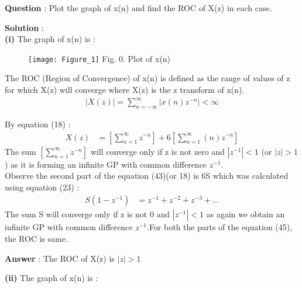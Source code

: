 \documentclass[journal,12pt,twocolumn]{IEEEtran}
\theoremstyle{remark}
\begin{document}
\newpage

\large\textbf{Question} : \normalsize Plot the graph of x(n) and find the ROC of X(z) in each case.

\large\textbf{Solution} :\\
\large\textbf{(i)} \normalsize The graph of x(n) is :
\begin{figure}[h]
    \begin{center}
    \texttt{[image: Figure\_1]}
    Fig. 0. Plot of x(n) \\
    \end{center}
\end{figure}

The ROC (Region of Convergence) of x(n) is defined as the range of values of z for which X(z) will converge where X(z) is the z transform of x(n).\\
\begin{align}
   \left|X(z)\right| = \sum_{n = -\infty}^{\infty}\left|x(n)z^{-n}\right| < \infty
\end{align}

By equation (18) :\\
\begin{align}
X(z) &=  \left[\sum_{n=1}^{\infty}z^{-n} \right] + 6\left[ \sum_{n=1}^{\infty}(n)z^{-n} \right]
\end{align}
The sum $ \left[\sum_{n=1}^{\infty}z^{-n} \right]$ will converge only if z is not zero and $\left|z^{-1}\right| < 1$ (or $|z| > 1$) as it is forming an infinite GP with common difference $z^{-1}$.\\

Observe the second part of the equation (43)(or 18) is 6S which was calculated using equation (23) : \\
\begin{align}
    S(1-z^{-1}) &= z^{-1} + z^{-2} + z^{-3} + ... 
\end{align}
The sum S will converge only if z is not 0 and $\left|z^{-1}\right| < 1$ as again we obtain an infinite GP with common difference $z^{-1}$.For both the parts of the equation (45), the ROC is same.

\vspace{4mm}

\large\textbf{Answer} : \normalsize The ROC of X(z) is  $|z| > 1$

\vspace{8mm}

\large\textbf{(ii)} \normalsize The graph of x(n) is :

\vspace{4mm}
\end{document}
